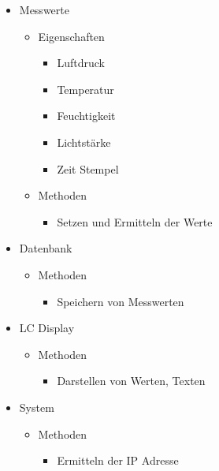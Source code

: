 \documentclass[
    10pt,
    a4paper,
]{scrartcl}
\begin{document}
\begin{itemize}
    \item Messwerte
        \begin{itemize}
            \item Eigenschaften
                \begin{itemize}
                    \item Luftdruck
                    \item Temperatur
                    \item Feuchtigkeit
                    \item Lichtstärke
                    \item Zeit Stempel
                \end{itemize}
            \item Methoden
                \begin{itemize}
                    \item Setzen und Ermitteln der Werte
                \end{itemize}
        \end{itemize}
    \item Datenbank
        \begin{itemize}
            \item Methoden
                \begin{itemize}
                    \item Speichern von Messwerten
                \end{itemize}
        \end{itemize}
    \item LC Display
        \begin{itemize}
            \item Methoden
                \begin{itemize}
                    \item Darstellen von Werten, Texten
                \end{itemize}
        \end{itemize}
    \item System
        \begin{itemize}
            \item Methoden
                \begin{itemize}
                    \item Ermitteln der IP Adresse
                \end{itemize}
        \end{itemize}
\end{itemize}
\end{document}
